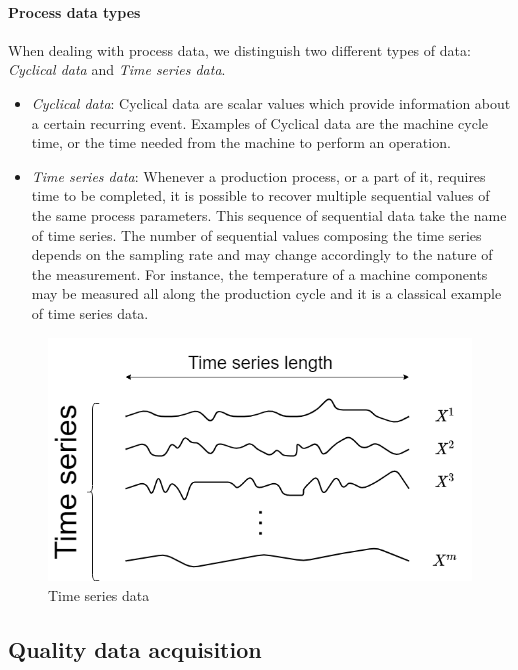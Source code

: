 \paragraph{Process data types}

When dealing with process data, we distinguish two different types of data: \textit{Cyclical data} and \textit{Time series data}.

\begin{itemize}
    \item \textit{Cyclical data}: Cyclical data are scalar values which provide information about a certain recurring event. Examples of Cyclical data are the machine cycle time, or the time needed from the machine to perform an operation. 
    \item \textit{Time series data}: Whenever a production process, or a part of it, requires time to be completed, it is possible to recover multiple sequential values of the same process parameters. This sequence of sequential data take the name of time series. The number of sequential values composing the time series depends on the sampling rate and may change accordingly to the nature of the measurement. For instance, the temperature of a machine components may be measured all along the production cycle and it is a classical example of time series data.
\end{itemize}

\begin{figure}
\centering
\includegraphics[scale=0.5]{images/chapter_3/time_series_data.png}
\caption{Time series data}
\label{fig:time_series_data}
\end{figure}


\subsection{Quality data acquisition}

